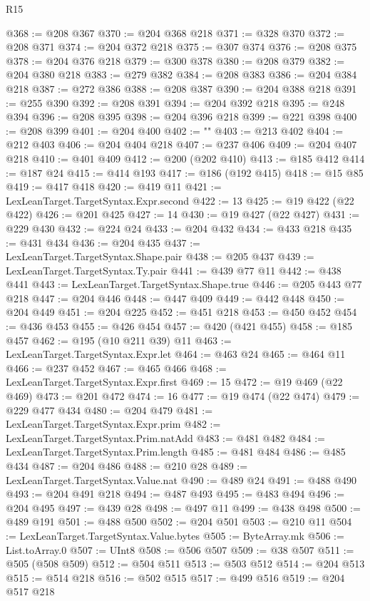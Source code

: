\begin{lexlean}{R15}
\begin{coremodule}
@368 := @208 @367
@370 := @204 @368 @218
@371 := @328 @370
@372 := @208 @371
@374 := @204 @372 @218
@375 := @307 @374
@376 := @208 @375
@378 := @204 @376 @218
@379 := @300 @378
@380 := @208 @379
@382 := @204 @380 @218
@383 := @279 @382
@384 := @208 @383
@386 := @204 @384 @218
@387 := @272 @386
@388 := @208 @387
@390 := @204 @388 @218
@391 := @255 @390
@392 := @208 @391
@394 := @204 @392 @218
@395 := @248 @394
@396 := @208 @395
@398 := @204 @396 @218
@399 := @221 @398
@400 := @208 @399
@401 := @204 @400
@402 := ""
@403 := @213 @402
@404 := @212 @403
@406 := @204 @404 @218
@407 := @237 @406
@409 := @204 @407 @218
@410 := @401 @409
@412 := @200 (@202 @410)
@413 := @185 @412
@414 := @187 @24
@415 := @414 @193
@417 := @186 (@192 @415)
@418 := @15 @85
@419 := @417 @418
@420 := @419 @11
@421 := LexLeanTarget.TargetSyntax.Expr.second
@422 := 13
@425 := @19 @422 (@22 @422)
@426 := @201 @425
@427 := 14
@430 := @19 @427 (@22 @427)
@431 := @229 @430
@432 := @224 @24
@433 := @204 @432
@434 := @433 @218
@435 := @431 @434
@436 := @204 @435
@437 := LexLeanTarget.TargetSyntax.Shape.pair
@438 := @205 @437
@439 := LexLeanTarget.TargetSyntax.Ty.pair
@441 := @439 @77 @11
@442 := @438 @441
@443 := LexLeanTarget.TargetSyntax.Shape.true
@446 := @205 @443 @77 @218
@447 := @204 @446
@448 := @447 @409
@449 := @442 @448
@450 := @204 @449
@451 := @204 @225
@452 := @451 @218
@453 := @450 @452
@454 := @436 @453
@455 := @426 @454
@457 := @420 (@421 @455)
@458 := @185 @457
@462 := @195 (@10 @211 @39) @11
@463 := LexLeanTarget.TargetSyntax.Expr.let
@464 := @463 @24
@465 := @464 @11
@466 := @237 @452
@467 := @465 @466
@468 := LexLeanTarget.TargetSyntax.Expr.first
@469 := 15
@472 := @19 @469 (@22 @469)
@473 := @201 @472
@474 := 16
@477 := @19 @474 (@22 @474)
@479 := @229 @477 @434
@480 := @204 @479
@481 := LexLeanTarget.TargetSyntax.Expr.prim
@482 := LexLeanTarget.TargetSyntax.Prim.natAdd
@483 := @481 @482
@484 := LexLeanTarget.TargetSyntax.Prim.length
@485 := @481 @484
@486 := @485 @434
@487 := @204 @486
@488 := @210 @28
@489 := LexLeanTarget.TargetSyntax.Value.nat
@490 := @489 @24
@491 := @488 @490
@493 := @204 @491 @218
@494 := @487 @493
@495 := @483 @494
@496 := @204 @495
@497 := @439 @28
@498 := @497 @11
@499 := @438 @498
@500 := @489 @191
@501 := @488 @500
@502 := @204 @501
@503 := @210 @11
@504 := LexLeanTarget.TargetSyntax.Value.bytes
@505 := ByteArray.mk
@506 := List.toArray.{0}
@507 := UInt8
@508 := @506 @507
@509 := @38 @507
@511 := @505 (@508 @509)
@512 := @504 @511
@513 := @503 @512
@514 := @204 @513
@515 := @514 @218
@516 := @502 @515
@517 := @499 @516
@519 := @204 @517 @218

\end{coremodule}
\end{lexlean}
